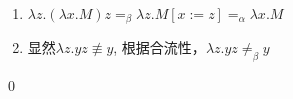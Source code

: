 \begin{pf} \rm 

    \begin{enumerate}
        \item $\lambda z.(\lambda x.M)z =_\beta \lambda z.M[x:=z]=_\alpha \lambda x.M$
        \item 显然$\lambda z.yz\not\equiv y$, 根据合流性，$\lambda z. yz\not=_\beta y$
    \end{enumerate}
    \qed
\end{pf}